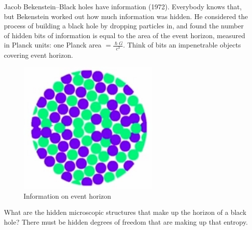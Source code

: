 \documentclass[]{article}
\begin{document}
Jacob Bekenstein--Black holes have information (1972). Everybody knows that, but Bekenstein worked out how much information was hidden. He considered the process of building a black hole by dropping particles in, and found the number of hidden bits of information is equal to the area of the event horizon, measured in Planck units: one Planck area $=\frac{\hslash G}{c^3}$. Think of bits an impenetrable objects covering event horizon.


\begin{figure}[H]
	\begin{center}
		\caption{Information on event horizon}
		\includegraphics{wh-info-event-horizon}
	\end{center}
\end{figure}

What are the hidden microscopic structures that make up the horizon of a black hole? There must be hidden degrees of freedom that are making up that entropy.
\end{document}
